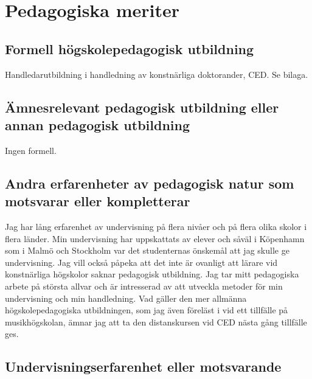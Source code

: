 
\section*{\textsf{Pedagogiska meriter}}

\subsection*{\textsf{Formell högskolepedagogisk utbildning}}

Handledarutbildning i handledning av konstnärliga doktorander, CED. Se bilaga.

\subsection*{\textsf{Ämnesrelevant pedagogisk utbildning eller annan pedagogisk utbildning}}

Ingen formell.

\subsection*{\textsf{Andra erfarenheter av pedagogisk natur som motsvarar eller kompletterar}}

Jag har lång erfarenhet av undervisning på flera nivåer och på flera olika skolor i flera länder. Min undervisning har uppskattats av elever och såväl i Köpenhamn som i Malmö och Stockholm var det studenternas önskemål att jag skulle ge undervisning. Jag vill också påpeka att det inte är ovanligt att lärare vid konstnärliga högskolor saknar pedagogisk utbildning. Jag tar mitt pedagogiska arbete på största allvar och är intresserad av att utveckla metoder för min undervisning och min handledning. Vad gäller den mer allmänna högskolepedagogiska utbildningen, som jag även föreläst i vid ett tillfälle på musikhögskolan, ämnar jag att ta den distanskursen vid CED nästa gång tillfälle ges.

\subsection*{\textsf{Undervisningserfarenhet eller motsvarande}}

